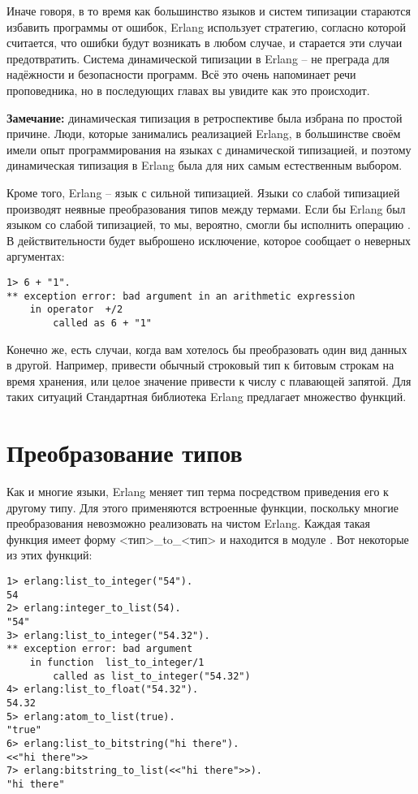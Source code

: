Иначе говоря, в то время как большинство языков и систем типизации стараются избавить программы от ошибок, Erlang использует стратегию, согласно которой считается, что ошибки будут возникать в любом случае, и старается эти случаи предотвратить.
Система динамической типизации в Erlang \--- не преграда для надёжности и безопасности программ.
Всё это очень напоминает речи проповедника, но в последующих главах вы увидите как это происходит.\\
\colorbox{lgray}
{
    \begin{minipage}{\linewidth}
\textbf{Замечание:} динамическая типизация в ретроспективе была избрана по простой причине.
Люди, которые занимались реализацией Erlang, в большинстве своём имели опыт программирования на языках с динамической типизацией, и поэтому динамическая типизация в Erlang была для них самым естественным выбором.
    \end{minipage}
}

Кроме того, Erlang \--- язык с сильной типизацией.
Языки со слабой типизацией производят неявные преобразования типов между термами.
Если бы Erlang был языком со слабой типизацией, то мы, вероятно, смогли бы исполнить операцию .
В действительности будет выброшено исключение, которое сообщает о неверных аргументах:
\begin{lstlisting}[style=erlang]
1> 6 + "1".
** exception error: bad argument in an arithmetic expression
    in operator  +/2
        called as 6 + "1"
\end{lstlisting}

Конечно же, есть случаи, когда вам хотелось бы преобразовать один вид данных в другой.
Например, привести обычный строковый тип к битовым строкам на время хранения, или целое значение привести к числу с плавающей запятой.
Для таких ситуаций Стандартная библиотека Erlang предлагает множество функций.
\section{Преобразование типов}
Как и многие языки, Erlang меняет тип терма посредством приведения его к другому типу.
Для этого применяются встроенные функции, поскольку многие преобразования невозможно реализовать на чистом Erlang.
Каждая такая функция имеет форму <тип>\_to\_<тип> и находится в модуле .
Вот некоторые из этих функций:
\begin{lstlisting}[style=erlang]
1> erlang:list_to_integer("54").
54
2> erlang:integer_to_list(54).
"54"
3> erlang:list_to_integer("54.32").
** exception error: bad argument
    in function  list_to_integer/1
        called as list_to_integer("54.32")
4> erlang:list_to_float("54.32").
54.32
5> erlang:atom_to_list(true).
"true"
6> erlang:list_to_bitstring("hi there").
<<"hi there">>
7> erlang:bitstring_to_list(<<"hi there">>).
"hi there"
\end{lstlisting}

